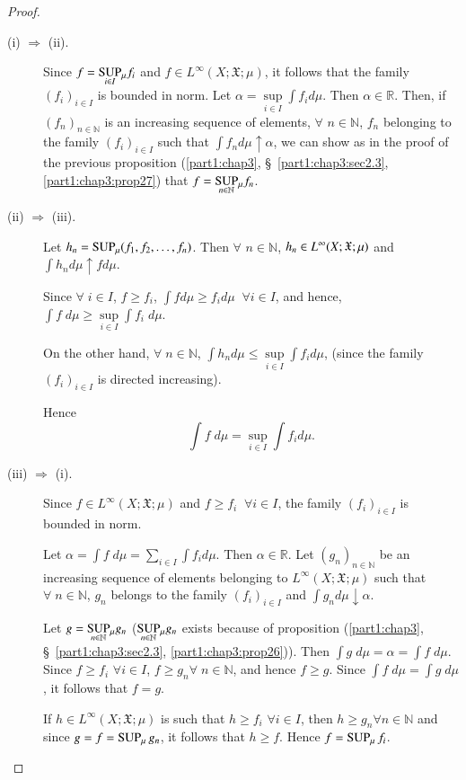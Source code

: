 \begin{proof}
\begin{description}
\item[{\rm (i) $\Longrightarrow$ (ii).}] Since $f = \underset{i \in
  I}{\operatorname{SUP}} {}_\mu f_i$ and $f \in L^\infty(X; \mathfrak{X}; \mu)$, it
  follows that the family $(f_i)_{i \in I}$ is bounded in norm. Let
  $\alpha = \sup\limits_{i \in I} \int f_i d \mu$. Then $\alpha
  \in\mathbb{R}$. Then, if\pageoriginale $(f_n)_{n \in\mathbb{N}}$ is
  an increasing sequence of elements, $\forall$ $n \in \mathbb{N}$,
  $f_n$ belonging to the family $(f_i)_{i \in I}$ such that $\int f_n
  d \mu \uparrow \alpha$, we can show as in the proof of the previous
  proposition (\ref{part1:chap3}, \S\ \ref{part1:chap3:sec2.3},
  \ref{part1:chap3:prop27}) that $f = \underset{n \in \mathbb{N}} 
 {\operatorname{SUP}} {}_\mu f_n$. 


\item[{\rm (ii) $\Longrightarrow$ (iii).}] Let $h_n = \operatorname{SUP}_\mu (f_1,
  f_2, \ldots, f_n)$. Then $\forall $ $n \in\mathbb{N}$, $h_n \in
  L^\infty (X;\break \mathfrak{X}; \mu)$  and $\int h_n d \mu \uparrow f d
  \mu$. 

Since $\forall \; i \in I$, $f \geq f_i$, $\int f d \mu \geq f_i d
\mu  \;\; \forall i \in I$, and  hence, $\int f \; d \mu \geq \sup\limits_{i
\in I} \int f_i \; d\mu$. 

On the other hand, $\forall \; n \in \mathbb{N}$, $\int h_n d \mu \leq
\sup\limits_{i \in I} \int f_i d \mu$, (since the family $(f_i)_{i \in
I}$ is directed increasing). 

Hence
$$
\int f \; d\mu = \sup\limits_{i \in I} \int f_i d \mu. 
$$ 

\item[{\rm (iii) $\Longrightarrow$ (i).}] Since $f \in L^\infty(X;
  \mathfrak{X}; \mu)$  and $f\geq f_i \;\; \forall i \in I$, the family
  $(f_i)_{i \in I}$ is bounded in norm.

Let $\alpha = \int f \; d\mu  = \sum\limits_{i \in I} \int f_i
d\mu$. Then $\alpha \in \mathbb{R}$. Let $(g_n)_{n \in\mathbb{N}}$ be
an increasing sequence of elements belonging to $L^\infty (X;
\mathfrak{X}; \mu)$ such that $\forall \; n \in\mathbb{N}$, $g_n$
belongs to the family $(f_i)_{i \in I}$ and $\int g_n d \mu \downarrow
\alpha$. 

Let $g = \underset{n \in\mathbb{N}}{\operatorname{SUP}} {}_\mu g_n$ ($\underset{n \in
  \mathbb{N}}{\operatorname{SUP}}{}_\mu g_n$ exists because of proposition (\ref{part1:chap3},
  \S\ \ref{part1:chap3:sec2.3}, \ref{part1:chap3:prop26})). Then $\int
  g \; d\mu = \alpha = \int f \; d 
  \mu$. Since $f \geq f_i$ $\forall i \in I$, $f \geq g_n \forall\; n
  \in \mathbb{N}$, and hence $f \geq g$. Since $\int f \; d \mu = \int
  g \; d\mu$, it follows that $f = g$. 

If $h \in L^\infty (X; \mathfrak{X}; \mu)$  is such that $h \geq f_i $
$\forall i \in I$, then $h \geq g_n \forall n \in \mathbb{N}$ and
since $g = f = \operatorname{SUP}_\mu g_n$, it follows that $h \geq f$. Hence $f =
\operatorname{SUP}_\mu f_i$. 
\end{description}
\end{proof}

